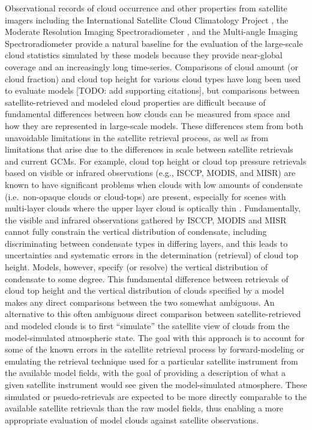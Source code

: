 Observational records of cloud occurrence and other properties from
satellite imagers including the International Satellite Cloud
Climatology Project \citep[ISCCP;][]{rossow_and_schiffer_1999}, the
Moderate Resolution Imaging Spectroradiometer
\citep[MODIS;][]{king_et_al_2003}, and the Multi-angle Imaging
Spectroradiometer \citep[MISR;][]{diner_et_al_2002, diner_et_al_2005}
provide a natural baseline for the evaluation of the large-scale cloud
statistics simulated by these models because they provide near-global
coverage and an increasingly long time-series. Comparisons of cloud
amount (or cloud fraction) and cloud top height for various cloud types
have long been used to evaluate models {[}TODO: add supporting
citations{]}, but comparisons between satellite-retrieved and modeled
cloud properties are difficult because of fundamental differences
between how clouds can be measured from space and how they are
represented in large-scale models. These differences stem from both
unavoidable limitations in the satellite retrieval process, as well as
from limitations that arise due to the differences in scale between
satellite retrievals and current GCMs. For example, cloud top height or
cloud top pressure retrievals based on visible or infrared observations
(e.g., ISCCP, MODIS, and MISR) are known to have significant problems
when clouds with low amounts of condensate (i.e.~non-opaque clouds or
cloud-tops) are present, especially for scenes with multi-layer clouds
where the upper layer cloud is optically thin
\citep{marchand_et_al_2010, pincus_et_al_2012}. Fundamentally, the
visible and infrared observations gathered by ISCCP, MODIS and MISR
cannot fully constrain the vertical distribution of condensate,
including discriminating between condensate types in differing layers,
and this leads to uncertainties and systematic errors in the
determination (retrieval) of cloud top height. Models, however, specify
(or resolve) the vertical distribution of condensate to some degree.
This fundamental difference between retrievals of cloud top height and
the vertical distribution of clouds specified by a model makes any
direct comparisons between the two somewhat ambiguous. An alternative to
this often ambiguous direct comparison between satellite-retrieved and
modeled clouds is to first ``simulate'' the satellite view of clouds
from the model-simulated atmospheric state. The goal with this approach
is to account for some of the known errors in the satellite retrieval
process by forward-modeling or emulating the retrieval technique used
for a particular satellite instrument from the available model fields,
with the goal of providing a description of what a given satellite
instrument would see given the model-simulated atmosphere. These
simulated or psuedo-retrievals are expected to be more directly
comparable to the available satellite retrievals than the raw model
fields, thus enabling a more appropriate evaluation of model clouds
against satellite observations.

